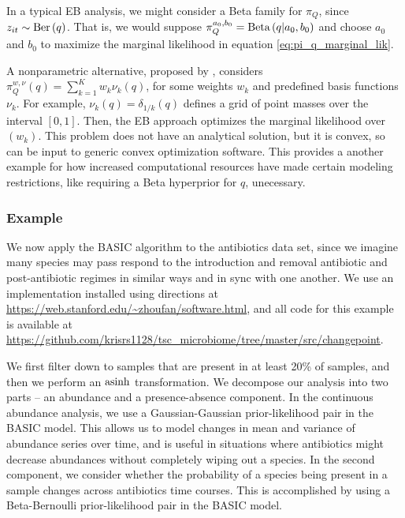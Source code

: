 \documentclass[14pt]{extreport}
\begin{document}
In a typical EB analysis, we might consider a Beta family for $\pi_{Q}$, since
$z_{it} \sim \textnormal{Ber}\left(q\right)$. That is, we would suppose $\pi_{Q}^{a_0, b_0}
= \textnormal{Beta}\left(q \vert a_{0}, b_{0}\right)$ and choose $a_{0}$ and $b_0$ to
maximize the marginal likelihood in equation \ref{eq:pi_q_marginal_lik}.

A nonparametric alternative, proposed by \citep{fan2015empirical}, considers
$\pi_{Q}^{w, \nu}\left(q\right) = \sum_{k = 1}^{K} w_{k} \nu_{k}\left(q\right)$,
for some weights $w_{k}$ and predefined basis functions $\nu_{k}$. For example,
$\nu_{k}\left(q\right) = \delta_{1 / k}\left(q\right)$ defines a grid of point
masses over the interval $\left[0, 1\right]$. Then, the EB approach optimizes
the marginal likelihood over $\left(w_k\right)$. This problem does not have an
analytical solution, but it is convex, so can be input to generic convex
optimization software. This provides a another example for how increased
computational resources have made certain modeling restrictions, like requiring
a Beta hyperprior for $q$, unecessary.


\subsubsection{Example}
\label{subsec:basic_example}

We now apply the BASIC algorithm to the antibiotics data set, since we imagine
many species may pass respond to the introduction and removal antibiotic and
post-antibiotic regimes in similar ways and in sync with one another. We use an
implementation installed using directions at
\url{https://web.stanford.edu/~zhoufan/software.html}, and all code for this
example is available at
\url{https://github.com/krisrs1128/tsc_microbiome/tree/master/src/changepoint}.

We first filter down to samples that are present in at least 20\% of samples,
and then we perform an $\mathop\mathrm{asinh}$ transformation. We decompose our analysis into
two parts -- an abundance and a presence-absence component. In the continuous
abundance analysis, we use a Gaussian-Gaussian prior-likelihood pair in the
BASIC model. This allows us to model changes in mean and variance of abundance
series over time, and is useful in situations where antibiotics might decrease
abundances without completely wiping out a species. In the second component, we
consider whether the probability of a species being present in a sample changes
across antibiotics time courses. This is accomplished by using a Beta-Bernoulli
prior-likelihood pair in the BASIC model.
\end{document}

